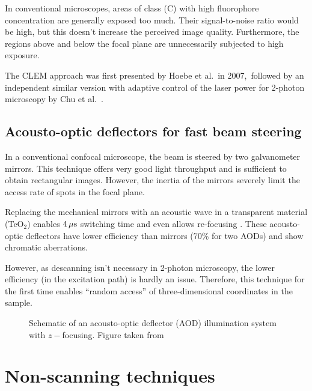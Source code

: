 In conventional microscopes, areas of class (C) with high fluorophore
concentration are generally exposed too much. Their signal-to-noise
ratio would be high, but this doesn't increase the perceived image
quality. Furthermore, the regions above and below the focal plane are
unnecessarily subjected to high exposure.

The CLEM approach was first presented by Hoebe et al.\ in
2007,\ followed by an independent similar
version with adaptive control of the laser power for 2-photon
microscopy by Chu et al.\ \citep{Hoebe2007,Chu2007}.
\subsection{Acousto-optic deflectors for fast beam steering}
In a conventional confocal microscope, the beam is steered by two
galvanometer mirrors. This technique offers very good light throughput
and is sufficient to obtain rectangular images. However, the inertia
of the mirrors severely limit the access rate of spots in the focal
plane.

Replacing the mechanical mirrors with an acoustic wave in a
transparent material (TeO$_2$) enables $\unit[4]{\mu s}$ switching
time \citep{Otsu2008} and even allows re-focusing
\citep{Reddy2008}. These acousto-optic deflectors have lower
efficiency than mirrors (70\% for two AODs) and show chromatic
aberrations.

However, as descanning isn't necessary in 2-photon microscopy, the
lower efficiency (in the excitation path) is hardly an
issue. Therefore, this technique for the first time enables ``random
access'' of three-dimensional coordinates in the sample.

\begin{figure}[!hbt]
  \centering
  \caption{Schematic of an acousto-optic deflector (AOD) illumination
    system with $z-$focusing. Figure taken from \citet{Reddy2008}}
  \label{fig:aod}
\end{figure}


\section{Non-scanning techniques}
